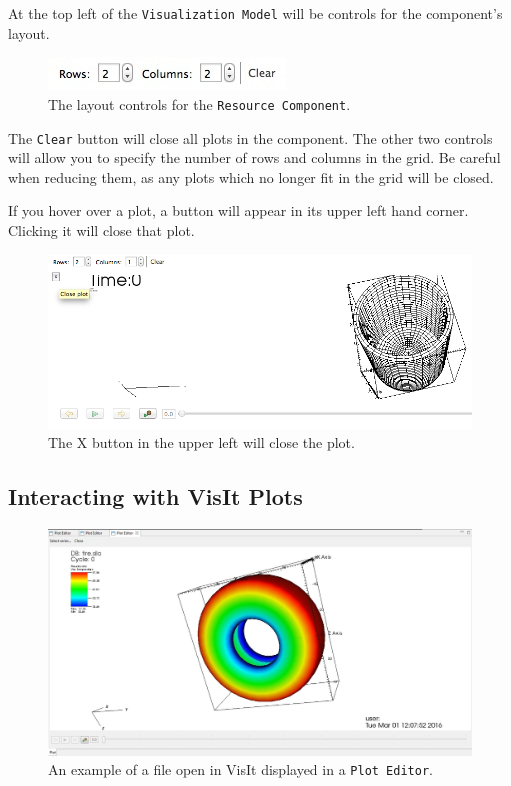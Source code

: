 At the top left of the \texttt{Visualization Model} will be controls for the
component's layout.

\begin{figure}[!h]
\includegraphics{images/ResourceComponentControls}
\centering
\caption{The layout controls for the \texttt{Resource Component}.}
\label{fig:resourcecomponentcontrols}
\end{figure}

The \texttt{Clear} button will close all plots in the component. The other two
controls will allow you to specify the number of rows and columns in the grid.
Be careful when reducing them, as any plots which no longer fit in the grid will
be closed.

If you hover over a plot, a button will appear in its upper left hand corner.
Clicking it will close that plot. 

\begin{figure}[!h]
\includegraphics[width=12cm]{images/ClosePlotButton}
\centering
\caption{The X button in the upper left will close the plot.}
\label{fig:closeplotbutton}
\end{figure}

\subsection{Interacting with VisIt Plots}

\begin{figure}[!h]
\includegraphics[width=12cm]{images/VisItPlot}
\centering
\caption{An example of a file open in VisIt displayed in a \texttt{Plot
Editor}.}
\label{fig:visitplot}
\end{figure}

